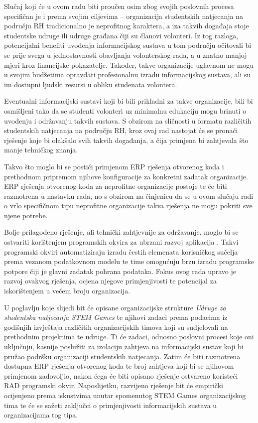 \documentclass[times, utf8, diplomski]{fer}
\begin{document}
Slučaj koji će u ovom radu biti proučen osim zbog svojih poslovnih procesa
specifičan je i prema svojim ciljevima -- organizacija studentskih natjecanja na
području RH tradicionalno je neprofitnog karaktera, a iza takvih događaja stoje
studentske udruge ili udruge građana čiji su članovi volonteri. Iz tog razloga,
potencijalni benefiti uvođenja informacijskog sustava u tom području očitovali
bi se prije svega u jednostavnosti obavljanja volonterskog rada, a u znatno
manjoj mjeri kroz financijske pokazatelje. Također, takve organizacije uglavnom
ne mogu u svojim budžetima opravdati profesionalnu izradu informacijskog
sustava, ali su im dostupni ljudski resursi u obliku studenata volontera.

Eventualni informacijski sustavi koji bi bili prikladni za takve organizacije,
bili bi osmišljeni tako da se studenti volonteri uz minimalnu edukaciju mogu
brinuti o uvođenju i održavanju takvih sustava. S obzirom na sličnosti u formatu
različitih studentskih natjecanja na području RH, kroz ovaj rad nastojat će se
pronaći rješenje koje bi olakšalo svih takvih događanja, a čija primjena bi
zahtjevala što manje tehničkog znanja.

Takvo što moglo bi se postići primjenom ERP rješenja otvorenog koda i prethodnom
pripremom njihove konfiguracije za konkretni zadatak organizacije. ERP rješenja
otvorenog koda za neprofitne organizacije postoje te će biti razmotrena u
nastavku rada, no s obzirom na činjenicu da se u ovom slučaju radi o vrlo
specifičnom tipu neprofitne organizacije takva rješenja ne mogu pokriti sve
njene potrebe.

Bolje prilagođeno rješenje, ali tehnički zahtjevnije za održavanje, moglo bi se
ostvariti korištenjem programskih okvira za ubrzani razvoj aplikacija
. Takvi programski okviri automatiziraju izradu čestih elemenata
korisničkog sučelja prema vezanom podatkovnom modelu te time omogućuju brzu
izradu programske potpore čiji je glavni zadatak pohrana podataka. Fokus ovog
rada upravo je razvoj ovakvog rješenja, ocjena njegove primjenjivosti te
potencijal za iskorištenjem u većem broju organizacija.

U poglavlju koje slijedi bit će opisane organizacijske strukture \emph{Udruge za
studentska natjecanja STEM Games} te njihovi zadaci prema podacima iz godišnjih
izvještaja različitih organizacijskih timova koji su sudjelovali na prethodnim
projektima te udruge. Ti će zadaci, odnosno poslovni procesi koje oni uključuju,
kasnije poslužiti za izolaciju zahtjeva na informacijski sustav koji bi pružao
podršku organizaciji studentskih natjecanja. Zatim će biti razmotrena dostupna
ERP rješenja otvorenog koda te broj zahtjeva koji bi se njihovom primjenom
zadovoljio, nakon ćega će biti opisano rješenje ostvareno koristeći RAD
programski okvir. Naposlijetku, razvijeno rješenje bit će empirički ocijenjeno
prema iskustvima unutar spomenutog STEM Games organizacijskog tima te će se
sažeti zaključci o primjenjivosti informacijskih sustava u organizacijama tog
tipa.
\end{document}
